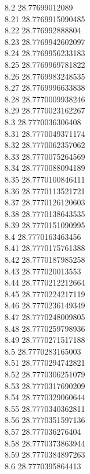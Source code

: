 {8.2	28.77699012089\\
8.21	28.7769915090485\\
8.22	28.776992888804\\
8.23	28.7769942602097\\
8.24	28.7769956233183\\
8.25	28.7769969781822\\
8.26	28.7769983248535\\
8.27	28.7769996633838\\
8.28	28.7770009938246\\
8.29	28.7770023162267\\
8.3	28.7770036306408\\
8.31	28.7770049371174\\
8.32	28.7770062357062\\
8.33	28.7770075264569\\
8.34	28.7770088094189\\
8.35	28.7770100846411\\
8.36	28.7770113521721\\
8.37	28.7770126120603\\
8.38	28.7770138643535\\
8.39	28.7770151090995\\
8.4	28.7770163463456\\
8.41	28.7770175761388\\
8.42	28.7770187985258\\
8.43	28.777020013553\\
8.44	28.7770212212664\\
8.45	28.7770224217119\\
8.46	28.7770236149349\\
8.47	28.7770248009805\\
8.48	28.7770259798936\\
8.49	28.7770271517188\\
8.5	28.7770283165003\\
8.51	28.7770294742821\\
8.52	28.7770306251079\\
8.53	28.7770317690209\\
8.54	28.7770329060644\\
8.55	28.7770340362811\\
8.56	28.7770351597136\\
8.57	28.777036276404\\
8.58	28.7770373863944\\
8.59	28.7770384897263\\
8.6	28.7770395864413\\
}
